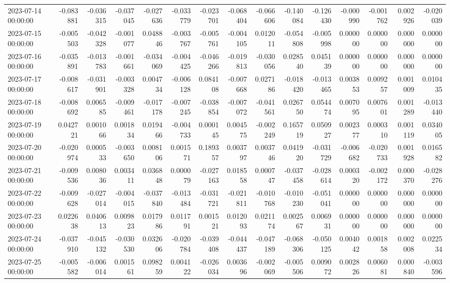 \begin{tabular}{lrrrrrrrrrrrrrr}
2023-07-14 00:00:00 & -0.083881 & -0.036315 & -0.037045 & -0.027636 & -0.033779 & -0.023701 & -0.068404 & -0.066606 & -0.140084 & -0.126430 & -0.000990 & -0.001762 & 0.002926 & -0.020039 \\
2023-07-15 00:00:00 & -0.005503 & -0.042328 & -0.001077 & 0.048846 & -0.003767 & -0.005761 & -0.004105 & 0.012011 & -0.054808 & -0.005998 & 0.000000 & 0.000000 & 0.000000 & 0.000000 \\
2023-07-16 00:00:00 & -0.035891 & -0.013783 & -0.001661 & -0.034069 & -0.004425 & -0.046266 & -0.019813 & -0.030056 & 0.028540 & 0.045139 & 0.000000 & 0.000000 & 0.000000 & 0.000000 \\
2023-07-17 00:00:00 & -0.008617 & -0.031901 & -0.003328 & 0.004734 & -0.006128 & 0.084108 & -0.007668 & 0.027186 & -0.018420 & -0.013465 & 0.003853 & 0.009257 & 0.001009 & 0.010435 \\
2023-07-18 00:00:00 & -0.008692 & 0.006585 & -0.009461 & -0.017178 & -0.007245 & -0.038854 & -0.007072 & -0.041561 & 0.026750 & 0.054474 & 0.007095 & 0.007601 & 0.001289 & -0.013440 \\
2023-07-19 00:00:00 & 0.042721 & 0.001066 & 0.001834 & 0.019466 & -0.004733 & 0.000145 & 0.004575 & -0.002249 & 0.165719 & 0.050927 & 0.002377 & 0.000310 & 0.001119 & 0.034005 \\
2023-07-20 00:00:00 & -0.020974 & 0.000533 & -0.003650 & 0.008106 & 0.001571 & 0.189357 & 0.003797 & 0.003746 & 0.041920 & -0.031729 & -0.006682 & -0.020733 & 0.001928 & 0.016582 \\
2023-07-21 00:00:00 & -0.009536 & 0.008036 & 0.003411 & 0.036848 & 0.000079 & -0.027163 & 0.018558 & 0.000747 & -0.037458 & -0.028614 & 0.000320 & -0.002172 & 0.000370 & -0.028276 \\
2023-07-22 00:00:00 & -0.009628 & -0.027014 & -0.004015 & -0.037840 & -0.013484 & -0.031721 & -0.021811 & -0.010768 & -0.010230 & -0.051041 & 0.000000 & 0.000000 & 0.000000 & 0.000000 \\
2023-07-23 00:00:00 & 0.022638 & 0.040613 & 0.009823 & 0.017986 & 0.011791 & 0.001521 & 0.012093 & 0.021174 & 0.002567 & 0.006931 & 0.000000 & 0.000000 & 0.000000 & 0.000000 \\
2023-07-24 00:00:00 & -0.037910 & -0.045132 & -0.030530 & 0.032606 & -0.020784 & -0.039408 & -0.044437 & -0.047189 & -0.068306 & -0.050125 & 0.004042 & 0.001858 & 0.002008 & 0.022534 \\
2023-07-25 00:00:00 & -0.005582 & -0.006014 & 0.001561 & 0.098259 & 0.004122 & -0.026034 & 0.003696 & -0.002069 & -0.005506 & 0.009072 & 0.002826 & 0.006081 & 0.000840 & -0.003596 \\

\end{tabular}
